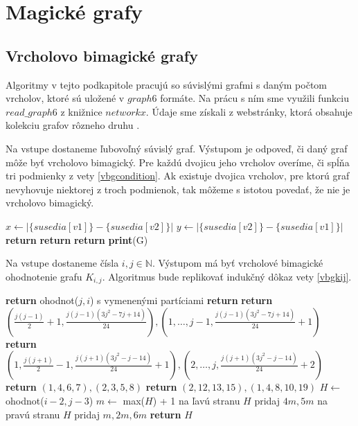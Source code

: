 \section{Magické grafy}

\subsection{Vrcholovo bimagické grafy}

Algoritmy v tejto podkapitole pracujú so súvislými grafmi s daným počtom vrcholov, ktoré sú uložené v $graph6$ formáte. Na prácu s ním sme využili funkciu $read \_ graph6$ z knižnice $networkx$. Údaje sme získali z webstránky, ktorá obsahuje kolekciu grafov rôzneho druhu \cite{graphlist}. \\
 
\begin{alg}
\label{algvbgcondition}
Na vstupe dostaneme ľubovoľný súvislý graf. Výstupom je odpoveď, či daný graf môže byť vrcholovo bimagický. Pre každú dvojicu jeho vrcholov overíme, či spĺňa tri podmienky z vety \ref{vbgcondition}. Ak existuje dvojica vrcholov, pre ktorú graf nevyhovuje niektorej z troch podmienok, tak môžeme s istotou povedať, že nie je vrcholovo bimagický.
\end{alg}

\begin{algorithmic}
    \STATE $x \gets |\{susedia[v1]\} - \{susedia[v2]\}|$
    \STATE $y \gets |\{susedia[v2]\} - \{susedia[v1]\}|$
	\STATE \textbf{return}
    \ENDIF
	\STATE \textbf{return}
    \ENDIF
	\STATE \textbf{return}
    \ENDIF
\ENDFOR
\STATE \textbf{print}(G)
\end{algorithmic}


\begin{alg}
\label{algvbgkij}
Na vstupe dostaneme čísla $i,j \in \mathbb{N}$. Výstupom má byť vrcholové bimagické ohodnotenie grafu $K_{i,j}$. Algoritmus bude replikovať indukčný dôkaz vety \ref{vbgkij}.
\end{alg}

\begin{algorithmic}
	\STATE \textbf{return} ohodnot($j,i$) s vymenenými partíciami
\ENDIF
{}
	\STATE \textbf{return}
\ENDIF
{}
	\STATE \textbf{return} $(\frac{j(j-1)}{2} + 1, \frac{j(j-1)(3j^2-7j+14)}{24}), (1, \dots , j-1, \frac{j(j-1)(3j^2-7j+14)}{24} + 1)$
\ENDIF
{}
	\STATE \textbf{return} $(1, \frac{j(j+1)}{2} - 1, \frac{j(j+1)(3j^2-j-14)}{24} + 1), (2, \dots , j, \frac{j(j+1)(3j^2-j-14)}{24} + 2)$
\ENDIF
{}
	\STATE \textbf{return} $(1, 4, 6, 7), (2, 3, 5, 8)$
\ENDIF
{}
	\STATE \textbf{return} $(2, 12, 13, 15), (1, 4, 8, 10, 19)$
\ENDIF
\STATE $H \gets$ ohodnot($i - 2, j - 3$)
\STATE $m \gets$ max($H$) + 1
\STATE na ľavú stranu $H$ pridaj $4m, 5m$
\STATE na pravú stranu $H$ pridaj $m, 2m, 6m$
\STATE \textbf{return} $H$
\end{algorithmic}

